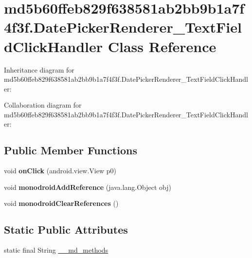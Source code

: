 \hypertarget{classmd5b60ffeb829f638581ab2bb9b1a7f4f3f_1_1_date_picker_renderer___text_field_click_handler}{}\section{md5b60ffeb829f638581ab2bb9b1a7f4f3f.\+Date\+Picker\+Renderer\+\_\+\+Text\+Field\+Click\+Handler Class Reference}
\label{classmd5b60ffeb829f638581ab2bb9b1a7f4f3f_1_1_date_picker_renderer___text_field_click_handler}


Inheritance diagram for md5b60ffeb829f638581ab2bb9b1a7f4f3f.\+Date\+Picker\+Renderer\+\_\+\+Text\+Field\+Click\+Handler\+:


Collaboration diagram for md5b60ffeb829f638581ab2bb9b1a7f4f3f.\+Date\+Picker\+Renderer\+\_\+\+Text\+Field\+Click\+Handler\+:
\subsection*{Public Member Functions}
\begin{DoxyCompactItemize}
\item 
\mbox{\label{classmd5b60ffeb829f638581ab2bb9b1a7f4f3f_1_1_date_picker_renderer___text_field_click_handler_a81aff3313b735fa41253b3b3077d3100}} 
void {\bfseries on\+Click} (android.\+view.\+View p0)
\item 
\mbox{\label{classmd5b60ffeb829f638581ab2bb9b1a7f4f3f_1_1_date_picker_renderer___text_field_click_handler_a2ddca20446ecf95867da36dea5970d47}} 
void {\bfseries monodroid\+Add\+Reference} (java.\+lang.\+Object obj)
\item 
\mbox{\label{classmd5b60ffeb829f638581ab2bb9b1a7f4f3f_1_1_date_picker_renderer___text_field_click_handler_a924d13da38fad223fa897e122738eb21}} 
void {\bfseries monodroid\+Clear\+References} ()
\end{DoxyCompactItemize}
\subsection*{Static Public Attributes}
\begin{DoxyCompactItemize}
\item 
static final String \hyperlink{classmd5b60ffeb829f638581ab2bb9b1a7f4f3f_1_1_date_picker_renderer___text_field_click_handler_a8220432a20203dce9a5e72418b7e64a1}{\+\_\+\+\_\+md\+\_\+methods}
\end{DoxyCompactItemize}


